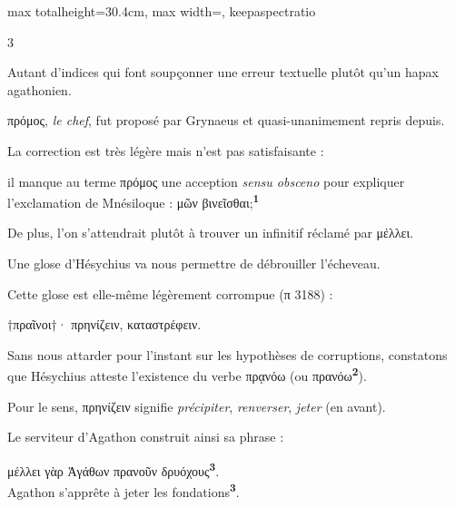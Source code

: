 \documentclass[11pt,twoside]{book}
\newcommand{\italique}[1]{\textit{#1}}
\newcommand{\citComm}[1]{\begin{quoting}[vskip=0.4pt,leftmargin=0.7em,rightmargin=0.2em]#1\end{quoting}}
\newcommand{\marqueur}[1]{\textsuperscript{\color{rubricRed}\textbf{#1}}}
\begin{document}
\begin{adjustbox}{max totalheight=30.4cm, max width=\textwidth, keepaspectratio}
\begin{minipage}{\textwidth}
{\begin{multicols}{3}
\par\vspace{1.5pt}
\noindent Autant d'indices qui font soupçonner une erreur textuelle plutôt qu'un hapax agathonien.
\par\vspace{1.5pt}
\noindent πρόμος, \italique{le chef}, fut proposé par Grynaeus et quasi-unanimement repris depuis.
\par\vspace{1.5pt}
\noindent La correction est très légère mais n'est pas satisfaisante :
\par\vspace{1.5pt}
\noindent il manque au terme πρόμος une acception \italique{sensu obsceno} pour expliquer l'exclamation de Mnésiloque : μῶν βινεῖσθαι;\marqueur{1}
\par\vspace{1.5pt}
\noindent De plus,  l'on s'attendrait plutôt à trouver un infinitif réclamé par μέλλει.
\par\vspace{1.5pt}
\noindent Une glose d'Hésychius va nous permettre de débrouiller l'écheveau.
\par\vspace{1.5pt}
\noindent Cette glose est elle-même légèrement corrompue (π 3188) :
\citComm{†πραῖνοι†· πρηνίζειν, καταστρέφειν.}
\par\vspace{1.5pt}
\noindent Sans nous attarder pour l'instant sur les hypothèses de corruptions, constatons que Hésychius atteste l'existence du verbe πρᾳνόω (ou πρανόω\marqueur{2}).
\par\vspace{1.5pt}
\noindent Pour le sens, πρηνίζειν signifie \italique{précipiter}, \italique{renverser}, \italique{jeter} (en avant).
\par\vspace{1.5pt}
\noindent Le serviteur d'Agathon construit ainsi sa phrase :
\citComm{μέλλει γὰρ Ἁγάθων πρανοῦν δρυόχους\marqueur{3}.\\
Agathon s'apprête à jeter les fondations\marqueur{3}.}
\par\vspace{1.5pt}

\end{multicols}}
\end{minipage}
\end{adjustbox}
\end{document}
